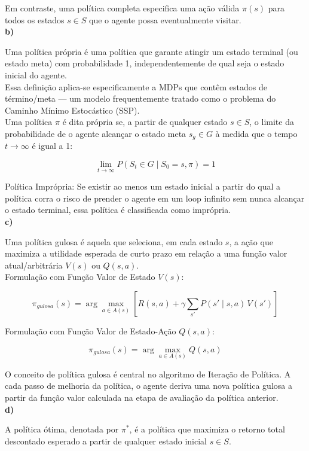 \documentclass[a4paper,12pt]{article}
\begin{document}
Em contraste, uma política completa especifica uma ação válida $\pi(s)$ para todos os estados $s \in S$ que o agente possa eventualmente visitar.  \\

\textbf{b)}

Uma política própria é uma política que garante atingir um estado terminal (ou estado meta) com probabilidade 1, independentemente de qual seja o estado inicial do agente.  \\

Essa definição aplica-se especificamente a MDPs que contêm estados de término/meta — um modelo frequentemente tratado como o problema do Caminho Mínimo Estocástico (SSP). \\

Uma política $\pi$ é dita própria se, a partir de qualquer estado $s \in S$, o limite da probabilidade de o agente alcançar o estado meta $s_g \in G$ à medida que o tempo $t \to \infty$ é igual a 1:  

$$\lim_{t \to \infty} P(S_t \in G \mid S_0 = s, \pi) = 1$$

Política Imprópria: Se existir ao menos um estado inicial a partir do qual a política corra o risco de prender o agente em um loop infinito sem nunca alcançar o estado terminal, essa política é classificada como imprópria. \\

\textbf{c)}

Uma política gulosa é aquela que seleciona, em cada estado $s$, a ação que maximiza a utilidade esperada de curto prazo em relação a uma função valor atual/arbitrária $V(s)$ ou $Q(s,a)$.\\

Formulação com Função Valor de Estado $V(s)$:

$$\pi_{gulosa}(s) = \arg\max_{a \in A(s)} \left[ R(s, a) + \gamma \sum_{s'} P(s' \mid s, a) \, V(s') \right]$$

Formulação com Função Valor de Estado-Ação $Q(s,a)$:

$$\pi_{gulosa}(s) = \arg\max_{a \in A(s)} Q(s, a)$$

O conceito de política gulosa é central no algoritmo de Iteração de Política. A cada passo de melhoria da política, o agente deriva uma nova política gulosa a partir da função valor calculada na etapa de avaliação da política anterior.\\

\textbf{d)}

A política ótima, denotada por $\pi^*$, é a política que maximiza o retorno total descontado esperado a partir de qualquer estado inicial $s \in S$.  \\
\end{document}
